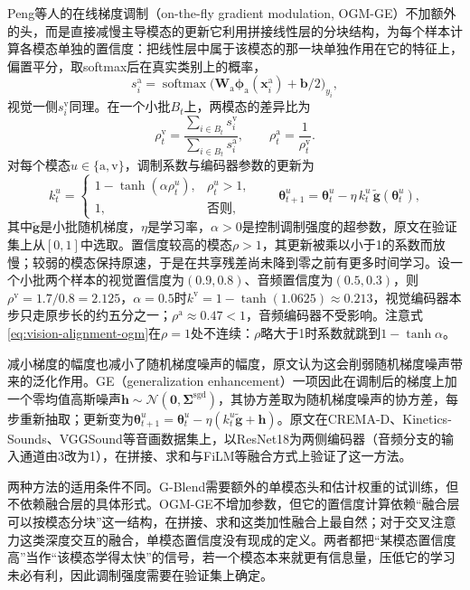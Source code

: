Peng等人的在线梯度调制（on-the-fly gradient modulation, OGM-GE）不加额外的头，而是直接减慢主导模态的更新它利用拼接线性层的分块结构，为每个样本计算各模态单独的置信度：把线性层中属于该模态的那一块单独作用在它的特征上，偏置平分，取softmax后在真实类别上的概率，
\[
  s_i^{\mathrm a}=\operatorname{softmax}\bigl(\bm W_{\mathrm a}\bm\phi_{\mathrm a}(\bm x_i^{\mathrm a})+\bm b/2\bigr)_{y_i},
\]
视觉一侧$s_i^{\mathrm v}$同理。在一个小批$B_t$上，两模态的差异比为
\[
  \rho_t^{\mathrm v}=\frac{\sum_{i\in B_t}s_i^{\mathrm v}}{\sum_{i\in B_t}s_i^{\mathrm a}},\qquad
  \rho_t^{\mathrm a}=\frac{1}{\rho_t^{\mathrm v}}.
\]
对每个模态$u\in\{\mathrm a,\mathrm v\}$，调制系数与编码器参数的更新为
\begin{equation}
  k_t^{u}=\begin{cases}1-\tanh(\alpha\rho_t^{u}),&\rho_t^{u}>1,\\1,&\text{否则},\end{cases}
  \qquad
  \bm\theta_{t+1}^{u}=\bm\theta_t^{u}-\eta\,k_t^{u}\,\tilde{\bm g}(\bm\theta_t^{u}),
  \label{eq:vision-alignment-ogm}
\end{equation}
其中$\tilde{\bm g}$是小批随机梯度，$\eta$是学习率，$\alpha>0$是控制调制强度的超参数，原文在验证集上从$[0,1]$中选取。置信度较高的模态$\rho>1$，其更新被乘以小于1的系数而放慢；较弱的模态保持原速，于是在共享残差尚未降到零之前有更多时间学习。设一个小批两个样本的视觉置信度为$(0.9,0.8)$、音频置信度为$(0.5,0.3)$，则$\rho^{\mathrm v}=1.7/0.8=2.125$，$\alpha=0.5$时$k^{\mathrm v}=1-\tanh(1.0625)\approx0.213$，视觉编码器本步只走原步长的约五分之一；$\rho^{\mathrm a}\approx0.47<1$，音频编码器不受影响。注意式\eqref{eq:vision-alignment-ogm}在$\rho=1$处不连续：$\rho$略大于1时系数就跳到$1-\tanh\alpha$。

减小梯度的幅度也减小了随机梯度噪声的幅度，原文认为这会削弱随机梯度噪声带来的泛化作用。GE（generalization enhancement）一项因此在调制后的梯度上加一个零均值高斯噪声$\bm h\sim\mathcal N(\bm 0,\bm\Sigma^{\mathrm{sgd}})$，其协方差取为随机梯度噪声的协方差，每步重新抽取；更新变为$\bm\theta_{t+1}^{u}=\bm\theta_t^{u}-\eta(k_t^{u}\tilde{\bm g}+\bm h)$。原文在CREMA-D、Kinetics-Sounds、VGGSound等音画数据集上，以ResNet18为两侧编码器（音频分支的输入通道由3改为1），在拼接、求和与FiLM等融合方式上验证了这一方法。

两种方法的适用条件不同。G-Blend需要额外的单模态头和估计权重的试训练，但不依赖融合层的具体形式。OGM-GE不增加参数，但它的置信度计算依赖“融合层可以按模态分块”这一结构，在拼接、求和这类加性融合上最自然；对于交叉注意力这类深度交互的融合，单模态置信度没有现成的定义。两者都把“某模态置信度高”当作“该模态学得太快”的信号，若一个模态本来就更有信息量，压低它的学习未必有利，因此调制强度需要在验证集上确定。

